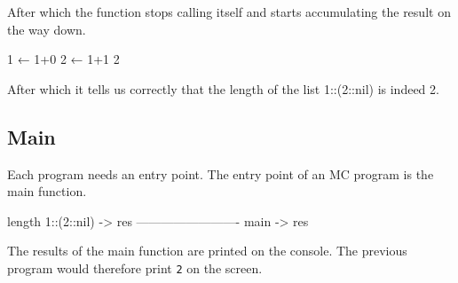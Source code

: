 After which the function stops calling itself and starts accumulating the result on the way down.

\begin{MC}[gobble=2]
          1 ← 1+0
      2 ← 1+1
  2
\end{MC}

After which it tells us correctly that the length of the list 1::(2::nil) is indeed 2.

\subsection{Main}
Each program needs an entry point.
The entry point of an MC program is the main function.

\begin{MC}
    length 1::(2::nil) -> res
    -------------------------
    main -> res
\end{MC}

The results of the main function are printed on the console.
The previous program would therefore print \verb|2| on the screen.

